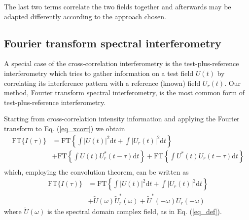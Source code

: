 \documentclass[12pt,a4paper,twoside]{article}
\begin{document}
The last two terms correlate the two fields together and afterwards may be adapted differently according to the approach chosen.

\subsection{Fourier transform spectral interferometry}
A special case of the cross-correlation interferometry is the test-plus-reference interferometry which tries to gather information on a test field $U(t)$ by correlating its interference pattern with a reference (known) field $U_r(t)$.
Our method, Fourier transform spectral interferometry, is the most common form of test-plus-reference interferometry.

Starting from cross-correlation intensity information and applying the Fourier transform to Eq. (\ref{eq_xcorr}) we obtain
\begin{align}
	\mathrm{FT} \lbrace I(\tau) \rbrace
	&= \mathrm{FT} 	\left\lbrace	
						\int|U(t)|^2\mathrm{d}t + \int|U_r(t)|^2\mathrm{d}t
					\right\rbrace \nonumber\\
	&+
		\mathrm{FT}	\left\lbrace	
						\int U(t)U_r^*(t-\tau)\mathrm{d}t
					\right\rbrace
	+	\mathrm{FT}	\left\lbrace	
						\int U^*(t)U_r(t-\tau)\mathrm{d}t
					\right\rbrace \\
	\label{eq_FTspectrum}
\end{align}
which, employing the convolution theorem, can be written as
\begin{align}
	\mathrm{FT} \lbrace I(\tau) \rbrace
	&= \mathrm{FT}	\left\lbrace \int|U(t)|^2\mathrm{d}t + \int|U_r(t)|^2\mathrm{d}t \right\rbrace \nonumber \\
	&+ \tilde{U}(\omega)\tilde{U}_r^*(\omega)
	+ \tilde{U}^*(-\omega)U_r(-\omega)
	\label{eq_FTspectrum1}
\end{align}
where $\tilde{U}(\omega)$ is the spectral domain complex field, as in Eq. (\ref{eq_def}).
\end{document}
